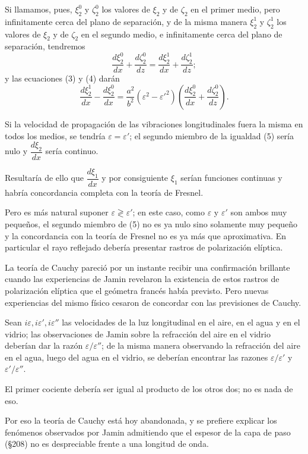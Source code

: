 Si llamamos, pues, $\xi_2^0$ y $\zeta_2^0$ los valores de $\xi_2$ y de
$\zeta_2$ en el primer medio, pero infinitamente cerca del plano de
separación, y de la misma manera $\xi_2^1$ y $\zeta_2^1$ los valores de
$\xi_2$ y de $\zeta_2$ en el segundo medio, e infinitamente cerca del
plano de separación, tendremos
\[
\frac{d\xi_2^0}{dx}+\frac{d\zeta_2^0}{dz}=\frac{d\xi_2^1}{dx}+\frac{d\zeta_2^1}{dz};
\]
y las ecuaciones (3) y (4) darán
\begin{equation}
\frac{d\xi_2^1}{dx}-\frac{d\xi_2^0}{dx}
=\frac{a^2}{b^2}(\varepsilon^2-\varepsilon'^2)\left(\frac{d\xi_2^0}{dx}+\frac{d\zeta_2^0}{dz}\right).
\end{equation}

Si la velocidad de propagación de las vibraciones longitudinales fuera la
misma en todos los medios, se tendría $\varepsilon=\varepsilon'$; el
segundo miembro de la igualdad (5) sería nulo y $\dfrac{d\xi_2}{dx}$ sería
continuo.

Resultaría de ello que $\dfrac{d\xi_1}{dx}$ y por consiguiente $\xi_1$
serían funciones continuas y habría concordancia completa con la teoría
de Fresnel.

Pero es más natural suponer $\varepsilon\gtrless\varepsilon'$; en este
caso, como $\varepsilon$ y $\varepsilon'$ son ambos muy pequeños, el
segundo miembro de (5) no es ya nulo sino solamente muy pequeño y la
concordancia con la teoría de Fresnel no es ya más que aproximativa. En
particular el rayo reflejado debería presentar rastros de polarización
elíptica.

La teoría de Cauchy pareció por un instante recibir una confirmación
brillante cuando las experiencias de Jamin revelaron la existencia de
estos rastros de polarización elíptica que el geómetra francés había
previsto. Pero nuevas experiencias del mismo físico cesaron de concordar
con las previsiones de Cauchy.

Sean $i\varepsilon,i\varepsilon',i\varepsilon''$ las velocidades de la luz
longitudinal en el aire, en el agua y en el vidrio; las observaciones de
Jamin sobre la refracción del aire en el vidrio deberían dar la razón
$\varepsilon/\varepsilon''$; de la misma manera observando la refracción
del aire en el agua, luego del agua en el vidrio, se deberían encontrar
las razones $\varepsilon/\varepsilon'$ y $\varepsilon'/\varepsilon''$.

El primer cociente debería ser igual al producto de los otros dos; no es
nada de eso.

Por eso la teoría de Cauchy está hoy abandonada, y se prefiere explicar
los fenómenos observados por Jamin admitiendo que el espesor de la capa
de paso (§208) no es despreciable frente a una longitud de onda.

